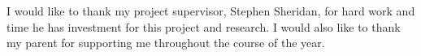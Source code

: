 \def\baselinestretch{1.0}
I would like to thank my project supervisor, Stephen Sheridan, for hard work and time he has investment for this project and research. I would also like to thank my parent for supporting me throughout the course of the year.
